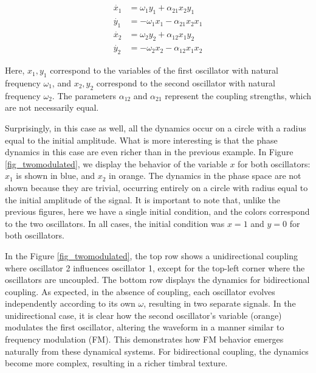 \documentclass{article}
\begin{document}
\begin{subequations} \label{eq_twomodulated}
\begin{align}
    \dot{x_1} & = \omega_1 y_1+ \alpha_{21} x_2 y_1 \\
    \dot{y_1} & = -\omega_1 x_1 - \alpha_{21} x_2 x_1 \\
    \dot{x_2} & = \omega_2 y_2+ \alpha_{12} x_1 y_2 \\
    \dot{y_2} & = -\omega_2 x_2 - \alpha_{12} x_1 x_2 
\end{align}
\end{subequations}

Here, $x_1, y_1$ correspond to the variables of the first oscillator with natural frequency $\omega_1$, and $x_2, y_2$ correspond to the second oscillator with natural frequency $\omega_2$. The parameters $\alpha_{12}$ and $\alpha_{21}$ represent the coupling strengths, which are not necessarily equal.

Surprisingly, in this case as well, all the dynamics occur on a circle with a radius equal to the initial amplitude. 
What is more interesting is that the phase dynamics in this case are even richer than in the previous example. 
In Figure \ref{fig_twomodulated}, we display the behavior of the variable $x$ for both oscillators: $x_1$ is shown in blue, and $x_2$ in orange. 
The dynamics in the phase space are not shown because they are trivial, occurring entirely on a circle with 
radius equal to the initial amplitude of the signal. 
It is important to note that, unlike the previous figures, here we have a single initial condition, and the colors correspond to the two oscillators. 
In all cases, the initial condition was $x = 1$ and $y = 0$ for both oscillators.

In the Figure \ref{fig_twomodulated}, the top row shows a unidirectional coupling where oscillator 2 influences oscillator 1, except for the top-left corner where the oscillators are uncoupled. 
The bottom row displays the dynamics for bidirectional coupling. 
As expected, in the absence of coupling, each oscillator evolves independently according to its own $\omega$, resulting in two separate signals. 
In the unidirectional case, it is clear how the second oscillator's variable (orange) modulates the first oscillator, altering the waveform in a manner similar to frequency modulation (FM). 
This demonstrates how FM behavior emerges naturally from these dynamical systems. 
For bidirectional coupling, the dynamics become more complex, resulting in a richer timbral texture.
\end{document}
